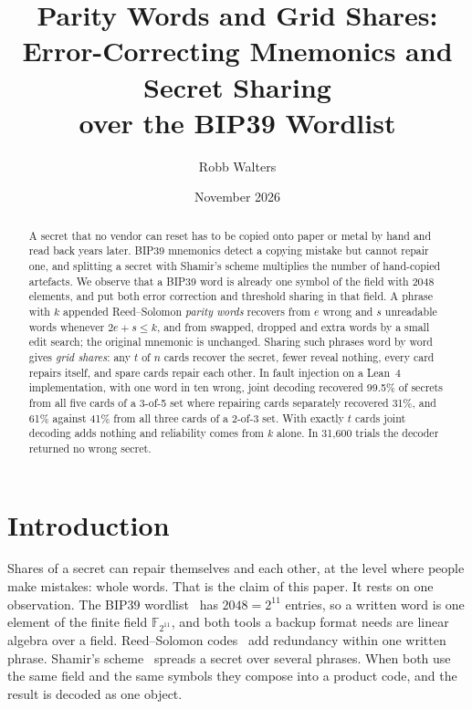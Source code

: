\documentclass[numeric]{anvil-paper}
\title{Parity Words and Grid Shares:\\ Error-Correcting Mnemonics and Secret Sharing\\ over the BIP39 Wordlist}
\author{Robb Walters}
\date{November 2026}
\newcommand{\F}{\mathbb{F}}
\begin{document}
\maketitle

\begin{abstract}
A secret that no vendor can reset has to be copied onto paper or metal by hand
and read back years later. BIP39 mnemonics detect a copying mistake but cannot
repair one, and splitting a secret with Shamir's scheme multiplies the number of
hand-copied artefacts. We observe that a BIP39 word is already one symbol of the
field with 2048 elements, and put both error correction and threshold sharing
in that field. A phrase with $k$ appended Reed--Solomon \emph{parity words}
recovers from $e$ wrong and $s$ unreadable words whenever $2e+s\le k$, and from
swapped, dropped and extra words by a small edit search; the original mnemonic
is unchanged. Sharing such phrases word by word gives \emph{grid shares}: any
$t$ of $n$ cards recover the secret, fewer reveal nothing, every card repairs
itself, and spare cards repair each other. In fault injection on a Lean~4
implementation, with one word in ten wrong, joint decoding recovered 99.5\% of
secrets from all five cards of a 3-of-5 set where repairing cards separately
recovered 31\%, and 61\% against 41\% from all three cards of a 2-of-3 set.
With exactly $t$ cards joint decoding adds nothing and reliability comes from
$k$ alone. In 31{,}600 trials the decoder returned no wrong secret.
\end{abstract}

\section{Introduction}
\label{sec:intro}

Shares of a secret can repair themselves and each other, at the level where
people make mistakes: whole words. That is the claim of this paper. It rests on
one observation. The BIP39 wordlist~\citep{bip39} has $2048 = 2^{11}$ entries,
so a written word is one element of the finite field $\F_{2^{11}}$, and both
tools a backup format needs are linear algebra over a field. Reed--Solomon
codes~\citep{reed1960polynomial} add redundancy within one written phrase.
Shamir's scheme~\citep{shamir1979how} spreads a secret over several phrases.
When both use the same field and the same symbols they compose into a product
code, and the result is decoded as one object.
\end{document}

